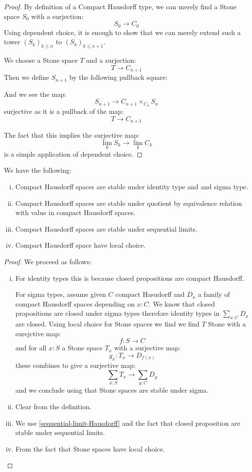 \begin{proof}
By definition of a Compact Hausdorff type, we can merely find a Stone space $S_0$ with a surjection:
\[S_0\to C_0\]
Using dependent choice, it is enough to show that we can merely extend such a tower $(S_k)_{k\leq n}$ to $(S_k)_{k\leq n+1}$.

We choose a Stone space $T$ and a surjection:
\[T \to C_{n+1} \]
Then we define $S_{n+1}$ by the following pullback square:
\begin{center}
\end{center}
And we see the map:
\[S_{n+1} \to C_{n+1}\times_{C_n} S_n\] 
surjective as it is a pullback of the map:
\[T\to C_{n+1}\]

The fact that this implies the surjective map:
\[\lim_kS_k \to \lim_k C_k\]
is a simple application of dependent choice.
\end{proof}

\begin{theorem}
We have the following:
\begin{enumerate}[(i)]
\item Compact Hausdorff spaces are stable under identity type and and sigma type.
\item Compact Hausdorff spaces are stable under quotient by equivalence relation with value in compact Hausdorff spaces.
\item Compact Hausdorff spaces are stable under sequential limits.
\item Compact Hausdorff space have local choice.
\end{enumerate}
\end{theorem}

\begin{proof}
We proceed as follows:
\begin{enumerate}[(i)]
\item For identity types this is because closed propositions are compact Hausdorff.

For sigma types, assume given $C$ compact Hasudorff and $D_x$ a family of compact Hausdorff spaces depending on $x:C$. We know that closed propositions are closed under sigma types therefore identity types in $\sum_{x:C}D_x$ are closed. Using local choice for Stone spaces we find we find $T$ Stone with a surejctive map:
\[f:S\to C\]
and for all $x:S$ a Stone space $T_x$ with a surjective map:
\[g_x:T_x\to D_{f(x)}\]
these combines to give a surjective map:
\[\sum_{x:S}T_x \to \sum_{y:C}D_y\]
and we conclude using that Stone spaces are stable under sigma.

\item Clear from the definition.

\item We use \cref{sequential-limit-Hausdorff} and the fact that closed proposition are stable under sequential limits.

\item From the fact that Stone spaces have local choice.
\end{enumerate}
\end{proof}
